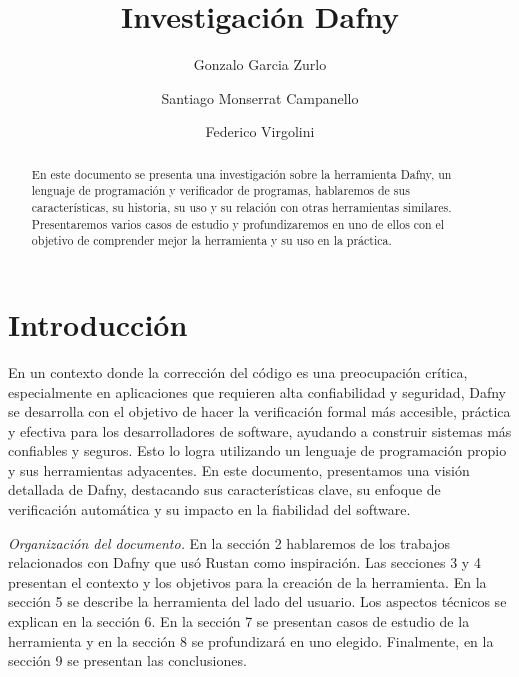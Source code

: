 \documentclass[runningheads]{llncs}
\begin{document}
%
\title{Investigación Dafny}
%
\author{Gonzalo Garcia Zurlo \and
Santiago Monserrat Campanello \and
Federico Virgolini}
%
%
%
\maketitle
\begin{abstract}
En este documento se presenta una investigación sobre la herramienta Dafny, un lenguaje de programación y verificador de programas,
hablaremos de sus características, su historia, su uso y su relación con otras herramientas similares. 
Presentaremos varios casos de estudio y profundizaremos en uno de ellos con el objetivo de comprender mejor la herramienta y su uso en la práctica.
\end{abstract}

\section{Introducción}

En un contexto donde la corrección del código es una preocupación crítica, especialmente en aplicaciones que requieren alta confiabilidad y seguridad,
Dafny se desarrolla con el objetivo de hacer la verificación formal más accesible, práctica y efectiva para los desarrolladores de software, 
ayudando a construir sistemas más confiables y seguros.
Esto lo logra utilizando un lenguaje de programación propio y sus herramientas adyacentes.
En este documento, presentamos una visión detallada de Dafny, 
destacando sus características clave, su enfoque de verificación automática y su impacto en la fiabilidad del software.

\emph{Organización del documento.} En la sección 2 hablaremos de los trabajos relacionados con Dafny que usó Rustan como inspiración.
Las secciones 3 y 4 presentan el contexto y los objetivos para la creación de la herramienta.
En la sección 5 se describe la herramienta del lado del usuario. Los aspectos técnicos se explican en la sección 6.
En la sección 7 se presentan casos de estudio de la herramienta y en la sección 8 se profundizará en uno elegido. 
Finalmente, en la sección 9 se presentan las conclusiones.
\end{document}
